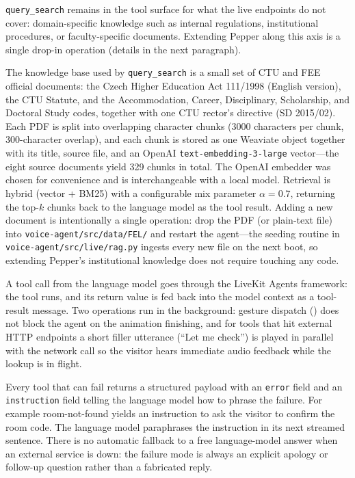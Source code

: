 \texttt{query\_search} remains in the tool surface for what the live endpoints do not cover: domain-specific knowledge such as internal regulations, institutional procedures, or faculty-specific documents.
Extending Pepper along this axis is a single drop-in operation (details in the next paragraph).

The knowledge base used by \texttt{query\_search} is a small set of CTU and FEE official documents: the Czech Higher Education Act 111/1998 (English version), the CTU Statute, and the Accommodation, Career, Disciplinary, Scholarship, and Doctoral Study codes, together with one CTU rector's directive (SD 2015/02).
Each PDF is split into overlapping character chunks (3000 characters per chunk, 300-character overlap), and each chunk is stored as one Weaviate object together with its title, source file, and an OpenAI \texttt{text-embedding-3-large} vector---the eight source documents yield 329 chunks in total.
The OpenAI embedder was chosen for convenience and is interchangeable with a local model.
Retrieval is hybrid (vector + BM25) with a configurable mix parameter $\alpha = 0.7$, returning the top-$k$ chunks back to the language model as the tool result.
Adding a new document is intentionally a single operation: drop the PDF (or plain-text file) into \texttt{voice-agent/src/data/FEL/} and restart the agent---the seeding routine in \texttt{voice-agent/src/live/rag.py} ingests every new file on the next boot, so extending Pepper's institutional knowledge does not require touching any code.


A tool call from the language model goes through the LiveKit Agents framework: the tool runs, and its return value is fed back into the model context as a tool-result message.
Two operations run in the background: gesture dispatch () does not block the agent on the animation finishing, and for tools that hit external HTTP endpoints a short filler utterance (``Let me check'') is played in parallel with the network call so the visitor hears immediate audio feedback while the lookup is in flight.


Every tool that can fail returns a structured payload with an \texttt{error} field and an \texttt{instruction} field telling the language model how to phrase the failure. For example room-not-found yields an instruction to ask the visitor to confirm the room code.
The language model paraphrases the instruction in its next streamed sentence.
There is no automatic fallback to a free language-model answer when an external service is down: the failure mode is always an explicit apology or follow-up question rather than a fabricated reply.



